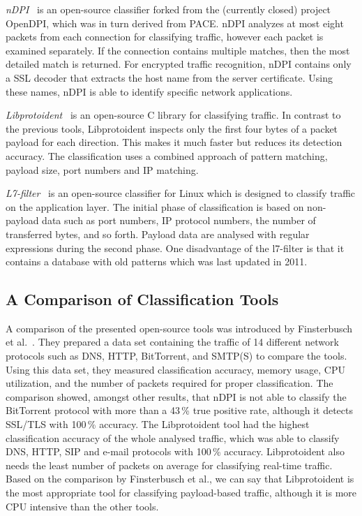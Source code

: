 \textit{nDPI}~\cite{Deri-2014-nDPI} is an open-source classifier forked from the (currently closed) project OpenDPI, which was in turn derived from PACE. nDPI analyzes at most eight packets from each connection for classifying traffic, however each packet is examined separately. If the connection contains multiple matches, then the most detailed match is returned. For encrypted traffic recognition, nDPI contains only a SSL decoder that extracts the host name from the server certificate. Using these names, nDPI is able to identify specific network applications.

\textit{Libprotoident}~\cite{Alcock-2012-libprotoident} is an open-source C library for classifying traffic. In contrast to the previous tools, Libprotoident inspects only the first four bytes of a packet payload for each direction. This makes it much faster but reduces its detection accuracy. The classification uses a combined approach of pattern matching, payload size, port numbers and IP matching.

\textit{L7-filter}~\cite{l7-filter} is an open-source classifier for Linux which is designed to classify traffic on the application layer. The initial phase of classification is based on non-payload data such as port numbers, IP protocol numbers, the number of transferred bytes, and so forth. Payload data are analysed with regular expressions during the second phase. One disadvantage of the l7-filter is that it contains a database with old patterns which was last updated in 2011.


\subsection{A Comparison of Classification Tools}
A comparison of the presented open-source tools was introduced by Finsterbusch et al.~\cite{Finsterbusch-2014-Survey}. They prepared a data set containing the traffic of 14 different network protocols such as DNS, HTTP, BitTorrent, and SMTP(S) to compare the tools. Using this data set, they measured classification accuracy, memory usage, CPU utilization, and the number of packets required for proper classification. The comparison showed, amongst other results, that nDPI is not able to classify the BitTorrent protocol with more than a 43\,\% true positive rate, although it detects SSL/TLS with 100\,\% accuracy. The Libprotoident tool had the highest classification accuracy of the whole analysed traffic, which was able to classify DNS, HTTP, SIP and e-mail protocols with 100\,\% accuracy. Libprotoident also needs the least number of packets on average for classifying real-time traffic. Based on the comparison by Finsterbusch et al., we can say that Libprotoident is the most appropriate tool for classifying payload-based traffic, although it is more CPU intensive than the other tools.

